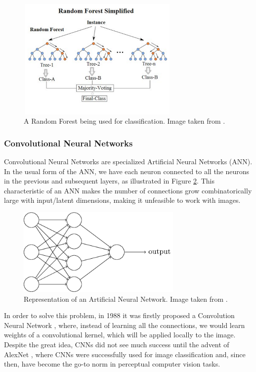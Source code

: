\begin{figure}[H]
    \includegraphics[width=0.7\textwidth]{Cap2-Methods/Random_forest_diagram_complete.png}
    \centering
	\caption{A Random Forest being used for classification. Image taken from \cite{randomimg}.}
	\label{random}
\end{figure}

\subsubsection{Convolutional Neural Networks}

Convolutional Neural Networks are specialized Artificial Neural Networks (ANN). In the usual form of the ANN, we have each neuron connected to all the neurons in the previous and subsequent layers, as illustrated in Figure \ref{ann}. This characteristic of an ANN makes the number of connections grow combinatorically large with input/latent dimensions, making it unfeasible to work with images.


\begin{figure}[H]
    \includegraphics[width=8cm]{Cap2-Methods/rede.png}
    \centering
	\caption{Representation of an Artificial Neural Network. Image taken from \cite{neuralimg}.}
	\label{ann}
\end{figure}

In order to solve this problem, in 1988 it was firstly proposed a Convolution Neural Network \cite{cnn_gordo}, where, instead of learning all the connections, we would learn weights of a convolutional kernel, which will be applied locally to the image. Despite the great idea, CNNs did not see much success until the advent of AlexNet \cite{alex}, where CNNs were successfully used for image classification and, since then, have become the go-to norm in perceptual computer vision tasks. 

